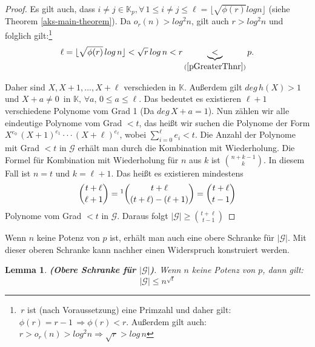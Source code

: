 \documentclass[12pt,oneside]{article}
\newtheorem{lemma}[theorem]{Lemma}
\theoremstyle{remark}
\theoremstyle{definition}
\begin{document}
\begin{proof}
Es gilt auch, dass $i \neq j  \in \mathbb{K}_p, \forall \, 1 \leq i \neq j \leq \ell = \lfloor \sqrt{\phi(r)} log n \rfloor$ (siehe Theorem \ref{aks-main-theorem}). Da $o_r(n) > log^2 n$, gilt auch $r > log^2 n$ und folglich gilt:\footnote{$\, r$ ist (nach Voraussetzung) eine Primzahl und daher gilt: $\phi(r) = r - 1  \, \Rightarrow \phi(r) < r$. Außerdem gilt auch: $r > o_r(n) > log^2n \Rightarrow \sqrt{r} > log \, n $}\newline\newline
\begin{align*}
    \ell = \lfloor \sqrt{\phi(r)} \, log \,  n \rfloor < \sqrt{r} \, log  \, n < r \underbrace{<}_{(\ref{pGreaterThnr})} p.
\end{align*}

Daher sind $X, X + 1, ..., X + \ell$ verschieden in $\mathbb{K}$. Außerdem gilt $deg \, h(X) > 1$ und $X + a \neq 0 \,$ in $\mathbb{K}, \, \forall a, \, 0 \leq a \leq \ell $. Das bedeutet es existieren $\ell + 1$ verschiedene Polynome vom Grad 1 (Da $deg \, X + a = 1$). Nun zählen wir alle eindeutige Polynome vom Grad $ < t$, das heißt wir suchen die Polynome der Form $X^{e_0} \, (X + 1)^{e_1} \cdot \cdot \cdot (X + \ell)^{e_\ell}$, wobei $\sum_{i = 0}^{\ell} e_i < t$. Die Anzahl der Polynome mit Grad $< t$ in $\mathcal{G}$ erhält man durch die Kombination mit Wiederholung. Die Formel für Kombination mit Wiederholung für $n$ aus  $k$ ist ${n + k - 1 \choose k}$. In diesem Fall ist $n = t $ und $k = \ell + 1$. Das heißt es existieren mindestens 
\begin{align*}
    {t + \ell  \choose \ell + 1} =\footnotemark {t + \ell \choose (t + \ell) - (\ell + 1)} = {t + \ell \choose t - 1}
\end{align*}
Polynome vom Grad $ < t $ in $\mathcal{G}$. Daraus folgt $| \mathcal{G}| \geq {t + \ell \choose t - 1} $ 
\end{proof}

Wenn $n$ keine Potenz von $p$ ist, erhält man auch eine obere Schranke für $|\mathcal{G}|$. Mit dieser oberen Schranke kann nachher einen Widerspruch konstruiert werden. 

\begin{lemma}\label{closing_lemma}
\textbf{(Obere Schranke für $|\mathcal{G}|$)}.\newline
Wenn $n$ keine Potenz von $p$, dann gilt:
\begin{equation}
    |\mathcal{G}| \leq  n^{\sqrt{t}}
\end{equation}
\end{lemma}
\end{document}
